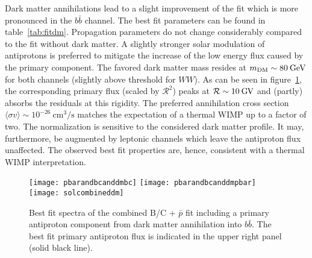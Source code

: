 \documentclass[a4paper,11pt]{article}
\newcommand{\eVdist}{\kern-0.06em}
\newcommand{\gev}{\:\text{Ge\eVdist V}}
\newcommand{\gv}{\:\text{G\eVdist V}}
\newcommand{\cm}{\:\text{cm}}
\newcommand{\R}{\mathcal{R}}
\begin{document}
Dark matter annihilations lead to a slight improvement of the fit which is more pronounced in the $b\bar{b}$ channel. The best fit parameters can be found in table~\ref{tab:fitdm}. Propagation parameters do not change considerably compared to the fit without dark matter. A slightly stronger solar modulation of
antiprotons is preferred to mitigate the increase of the low energy flux caused by the primary component. The favored dark matter mass resides at $m_{\text{DM}}\sim80\gev$ for both channels (slightly above threshold for $WW$). As can be seen in figure~\ref{fig:bcandpbaranddm}, the corresponding primary flux (scaled by $\R^2$) peaks at $\R\sim 10\gv$ and (partly) absorbs the residuals at this rigidity. The preferred annihilation cross section $\langle \sigma 
v\rangle\sim 10^{-26}\cm^3/\text{s}$ matches the expectation of a thermal WIMP up to a factor of two. The normalization is sensitive to the considered dark matter profile. It may, furthermore, be augmented by leptonic channels which leave the antiproton flux unaffected. The observed best fit properties are, hence, consistent with a thermal WIMP interpretation. 

\begin{figure}[htp]
\begin{center}
  \texttt{[image: pbarandbcanddmbc]}\hspace{3mm}
  \texttt{[image: pbarandbcanddmpbar]}\\[2mm]
  \texttt{[image: solcombineddm]}
\end{center}
\caption{Best fit spectra of the combined B/C + $\bar{p}$ fit including a primary antiproton component from dark matter annihilation into $b\bar{b}$. The best fit primary antiproton flux is indicated in the upper right panel (solid black line).}
\label{fig:bcandpbaranddm}
\end{figure}
\end{document}
